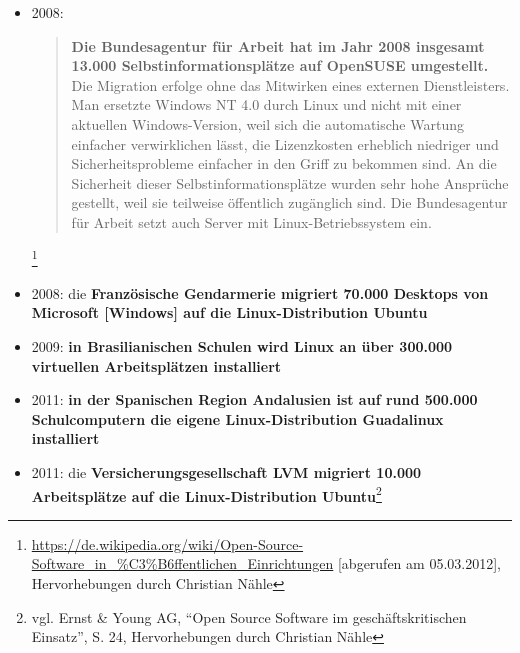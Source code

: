 \documentclass[a4paper]{scrartcl}
\begin{document}
\begin{itemize}
\begin{quotation}
Die Entwicklungs- und Vorbereitungszeit begann vor etwa zwei Jahren.  Bereits
seit der Jahrtausendwende sei überlegt worden, vom seit 1993 eingesetzten
Solaris x86 zu Linux zu migrieren. Den Ausschlag gegeben haben die Argumente
``frei zugängliche Quellen, keinerlei Lizenzkosten und bestmögliche
Unterstützung aktueller
Hardware''.\end{quotation}\footnote{\url{http://www.heise.de/open/meldung/Niedersaechsische-Steuerverwaltung-stellt-auf-Linux-um-128541.html}
[abgerufen am 13.03.2012], Hervorhebungen durch Christian Nähle}

\item 2008: \begin{quote}\textbf{Die Bundesagentur für Arbeit hat im Jahr 2008
      insgesamt 13.000 Selbstinformationsplätze auf OpenSUSE umgestellt.} Die
    Migration erfolge ohne das Mitwirken eines externen Dienstleisters. Man
    ersetzte Windows NT 4.0 durch Linux und nicht mit einer aktuellen
    Windows-Version, weil sich die automatische Wartung einfacher verwirklichen
    lässt, die Lizenzkosten erheblich niedriger und Sicherheitsprobleme
    einfacher in den Griff zu bekommen sind. An die Sicherheit dieser
    Selbstinformationsplätze wurden sehr hohe Ansprüche gestellt, weil sie
    teilweise öffentlich zugänglich sind. Die Bundesagentur für Arbeit setzt
    auch Server mit Linux-Betriebssystem
    ein.\end{quote}\footnote{\href{https://de.wikipedia.org/wiki/Open-Source-Software_in_?ffentlichen_Einrichtungen}{https://de.wikipedia.org/wiki/Open-Source-Software\_in\_\%C3\%B6ffentlichen\_Einrichtungen}
    [abgerufen am 05.03.2012], Hervorhebungen durch Christian Nähle}

\item 2008: die \textbf{Französische Gendarmerie migriert
70.000 Desktops von Microsoft [Windows] auf die Linux-Distribution
Ubuntu}

\item 2009: \textbf{in Brasilianischen Schulen wird Linux an über
300.000 virtuellen Arbeitsplätzen installiert}

\item 2011: \textbf{in der Spanischen Region Andalusien ist auf rund 500.000
    Schulcomputern die eigene Linux-Distribution Guadalinux installiert}

\item 2011: die \textbf{Versicherungsgesellschaft LVM migriert 10.000
    Arbeitsplätze auf die Linux-Distribution Ubuntu}\footnote{vgl. Ernst \&
  Young AG, ``Open Source Software im geschäftskritischen Einsatz'', S. 24,
  Hervorhebungen durch Christian Nähle}


\end{itemize}
\end{document}
